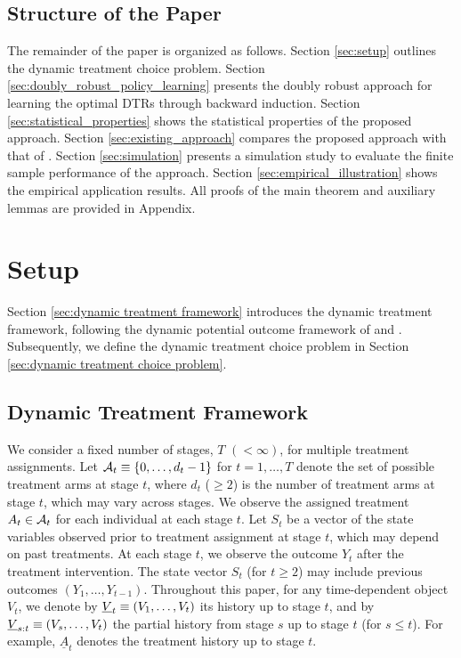 \subsection*{Structure of the Paper }
The remainder of the paper is organized as follows. Section \ref{sec:setup} outlines the dynamic treatment choice problem. Section \ref{sec:doubly_robust_policy_learning} presents the doubly robust approach for learning the optimal DTRs through backward induction. Section \ref{sec:statistical_properties} shows the statistical properties of the proposed approach. Section \ref{sec:existing_approach} compares the proposed approach with that of \cite{Zhang_et_2013}. Section \ref{sec:simulation} presents a simulation study to evaluate the finite sample performance of the approach. Section \ref{sec:empirical_illustration} shows the empirical application results. All proofs of the main theorem and auxiliary lemmas are provided in Appendix.


\section{Setup\label{sec:setup}}

Section \ref{sec:dynamic treatment framework} introduces the dynamic treatment framework, following the dynamic potential outcome framework of \citet{Robins_1986,Robins_1997} and \cite{Murphy_2003}. Subsequently, we define the dynamic treatment choice problem in Section \ref{sec:dynamic treatment choice problem}. 

\subsection{Dynamic Treatment Framework \label{sec:dynamic treatment framework}}

We consider a fixed number of stages, $T$ $(< \infty)$, for multiple treatment assignments.
Let $\mathcal{A}_{t} \equiv \{0,\ldots,d_t -1\}$ for $t=1,\ldots,T$ denote the set of possible treatment arms at stage $t$, where $d_t$ ($\geq 2$) is the number of treatment arms at stage $t$, which may vary across stages. We observe the assigned treatment $A_{t} \in \mathcal{A}_{t}$ for each individual at each stage $t$. Let $S_{t}$ be a vector of the state variables observed prior to treatment assignment at stage $t$, which may depend on past treatments. 
At each stage $t$, we observe the outcome $Y_{t}$ after the treatment intervention. The state vector $S_{t}$ (for $t \geq 2$) may include previous outcomes $(Y_{1},\ldots,Y_{t-1})$. 
Throughout this paper, for any time-dependent object $V_{t}$, we denote by $\text{\ensuremath{\text{\ensuremath{\underline{V}}}}}_{t}\equiv \left(V_{1},\ldots,V_{t}\right)$
its history up to stage $t$, and by $\text{\ensuremath{\underline{V}}}_{s:t} \equiv \left(V_{s},\ldots,V_{t}\right)$ the partial history from stage $s$ up to stage $t$ (for $s\leq t$).
For example, $\underline{A}_{t}$ denotes the treatment history up to stage $t$.

